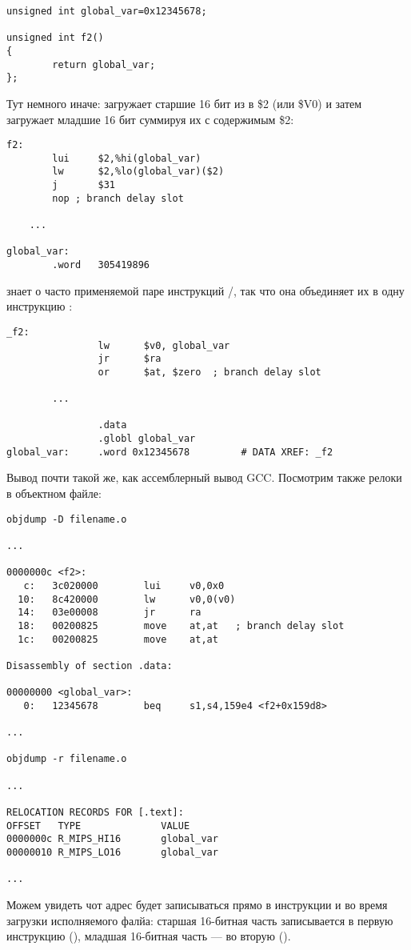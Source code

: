 \begin{lstlisting}
unsigned int global_var=0x12345678;

unsigned int f2()
{
        return global_var;
};
\end{lstlisting}


Тут немного иначе:  загружает старшие 16 бит из  в \$2 (или \$V0) и затем  загружает младшие
16 бит суммируя их с содержимым \$2:

\begin{lstlisting}[caption=GCC 4.4.5 -O3 (\assemblyOutput)]
f2:
        lui     $2,%hi(global_var)
        lw      $2,%lo(global_var)($2)
        j       $31
        nop	; branch delay slot

	...

global_var:
        .word   305419896
\end{lstlisting}

\IDA знает о часто применяемой паре инструкций /, так что она объединяет их в одну инструкцию :

\begin{lstlisting}[caption=GCC 4.4.5 -O3 (IDA)]
_f2:
                lw      $v0, global_var
                jr      $ra
                or      $at, $zero	; branch delay slot

		...

                .data
                .globl global_var
global_var:     .word 0x12345678         # DATA XREF: _f2
\end{lstlisting}

Вывод  почти такой же, как ассемблерный вывод GCC.
Посмотрим также релоки в объектном файле:

\begin{lstlisting}[caption=objdump]
objdump -D filename.o

...

0000000c <f2>:
   c:   3c020000        lui     v0,0x0
  10:   8c420000        lw      v0,0(v0)
  14:   03e00008        jr      ra
  18:   00200825        move    at,at	; branch delay slot
  1c:   00200825        move    at,at

Disassembly of section .data:

00000000 <global_var>:
   0:   12345678        beq     s1,s4,159e4 <f2+0x159d8>

...

objdump -r filename.o

...

RELOCATION RECORDS FOR [.text]:
OFFSET   TYPE              VALUE
0000000c R_MIPS_HI16       global_var
00000010 R_MIPS_LO16       global_var

...

\end{lstlisting}

Можем увидеть чот адрес  будет записываться прямо в инструкции  и  во время загрузки исполняемого
фалйа:
старшая 16-битная часть  записывается в первую инструкцию (), младшая 16-битная часть ---
во вторую ().

